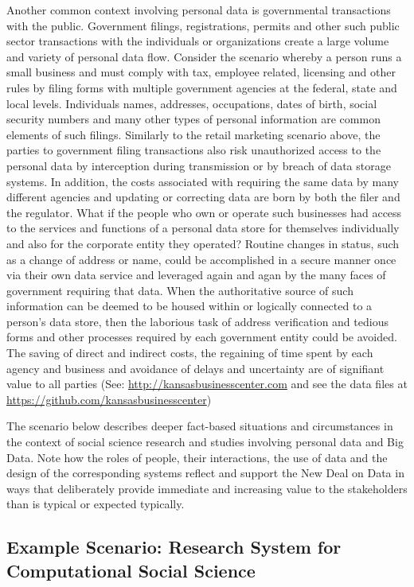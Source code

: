 Another common context involving personal data is governmental transactions with the public.  
Government filings, registrations, permits and other such public sector transactions with the individuals or organizations create a large volume and variety of personal data flow.
Consider the scenario whereby a person runs a small business and must comply with tax, employee related, licensing and other rules by filing forms with multiple government agencies at the federal, state and local levels.
Individuals names, addresses, occupations, dates of birth, social security numbers and many other types of personal information are common elements of such filings.
Similarly to the retail marketing scenario above, the parties to government filing transactions also risk unauthorized access to the personal data by interception during transmission or by breach of data storage systems.
In addition, the costs associated with requiring the same data by many different agencies and updating or correcting data are born by both the filer and the regulator.
What if the people who own or operate such businesses had access to the services and functions of a personal data store for themselves individually and also for the corporate entity they operated?
Routine changes in status, such as a change of address or name, could be accomplished in a secure manner once via their own data service and leveraged again and agan by the many faces of government requiring that data.
When the authoritative source of such information can be deemed to be housed within or logically connected to a person's data store, then the laborious task of address verification and tedious forms and other processes required by each government entity could be avoided. 
The saving of direct and indirect costs, the regaining of time spent by each agency and business and avoidance of delays and uncertainty are of signifiant value to all parties (See: \url{http://kansasbusinesscenter.com} and see the data files at  \url{https://github.com/kansasbusinesscenter})

The scenario below describes deeper fact-based situations and circumstances in the context of social science research and studies involving personal data and Big Data.
Note how the roles of people, their interactions, the use of data and the design of the corresponding systems reflect and support the New Deal on Data in ways that deliberately provide immediate and increasing value to the stakeholders than is typical or expected typically.


 \subsection{Example Scenario: Research System for Computational Social Science}

